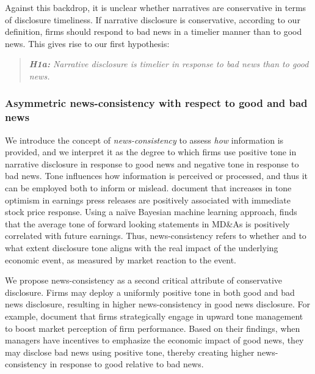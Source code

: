 \documentclass[letterpaper,12pt]{article}
\begin{document}
\begin{spacing}{1.5}
Against this backdrop, it is unclear whether narratives are conservative in terms of disclosure timeliness. If narrative disclosure is conservative, according to our definition, firms should respond to bad news in a timelier manner than to good news. This gives rise to our first hypothesis:

\begin{quote}\label{hyp:h1a}
	\textit{\textbf{H1a:} Narrative disclosure is timelier in response to bad news than to good news.}
\end{quote}

\subsubsection{Asymmetric news-consistency with respect to good and bad news}

\noindent We introduce the concept of \textit{news-consistency} to assess \textit{how} information is provided, and we interpret it as the degree to which firms use positive tone in narrative disclosure in response to good news and negative tone in response to bad news. %
Tone influences how information is perceived or processed, and thus it can be employed both to inform or mislead.  document that increases in tone optimism in earnings press releases are positively associated with immediate stock price response. Using a naïve Bayesian machine learning approach,  finds that the average tone of forward looking statements in MD\&As is positively correlated with future earnings. Thus, news-consistency refers to whether and to what extent disclosure tone aligns with the real impact of the underlying economic event, as measured by market reaction to the event. 

We propose news-consistency as a second critical attribute of conservative disclosure. Firms may deploy a uniformly positive tone in both good and bad news disclosure, resulting in higher news-consistency in good news disclosure. For example,  document that firms strategically engage in upward tone management to boost market perception of firm performance. Based on their findings, when managers have incentives to emphasize the economic impact of good news, they may disclose bad news using positive tone, thereby creating higher news-consistency in response to good relative to bad news. 


\end{spacing}
\end{document}
